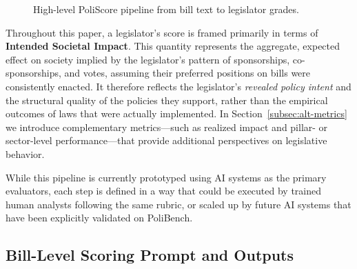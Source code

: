\documentclass[12pt]{article}
\begin{document}
\begin{figure}[h]
\centering
{}
\caption{High-level PoliScore pipeline from bill text to legislator grades.}
\label{fig:pipeline}
\end{figure}

\noindent
Throughout this paper, a legislator's score is framed primarily in terms of
\textbf{Intended Societal Impact}. This quantity represents the aggregate,
expected effect on society implied by the legislator's pattern of sponsorships,
co-sponsorships, and votes, assuming their preferred positions on bills were
consistently enacted. It therefore reflects the legislator's \emph{revealed
policy intent} and the structural quality of the policies they support, rather
than the empirical outcomes of laws that were actually implemented. In
Section~\ref{subsec:alt-metrics} we introduce complementary metrics---such as
realized impact and pillar- or sector-level performance---that provide additional
perspectives on legislative behavior.

While this pipeline is currently prototyped using AI systems as the primary evaluators, each step is defined in a way that
could be executed by trained human analysts following the same rubric, or scaled up by future AI systems that have been
explicitly validated on PoliBench.

\subsection{Bill-Level Scoring Prompt and Outputs}
\end{document}
